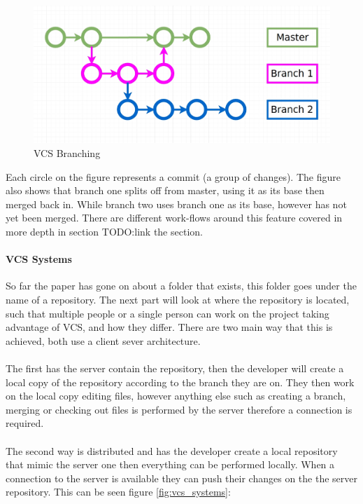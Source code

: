 \begin{figure}[H]
	\centering
	\includegraphics[scale=0.30]{images/branching.jpg}
	\caption{VCS Branching}
	\label{fig:vcs_branching}
\end{figure}

Each circle on the figure represents a commit (a group of changes). The figure also shows that branch one splits off from master, using it as its base then merged back in. While branch two uses branch one as its base, however has not yet been merged. There are different work-flows around this feature covered in more depth in section TODO:link the section.

\paragraph{VCS Systems}
So far the paper has gone on about a folder that exists, this folder goes under the name of a repository. The next part will look at where the repository is located, such that multiple people or a single person can work on the project taking advantage of VCS, and how they differ. There are two main way that this is achieved, both use a client sever architecture. 
\\\\
The first has the server contain the repository, then the developer will create a local copy of the repository according to the branch they are on. They then work on the local copy editing files, however anything else such as creating a branch, merging or checking out files is performed by the server therefore a connection is required.
\\\\
The second way is distributed and has the developer create a local repository that mimic the server one then everything can be performed locally. When a connection to the server is available they can push their changes on the the server repository. This can be seen figure \ref{fig:vcs_systems}:


